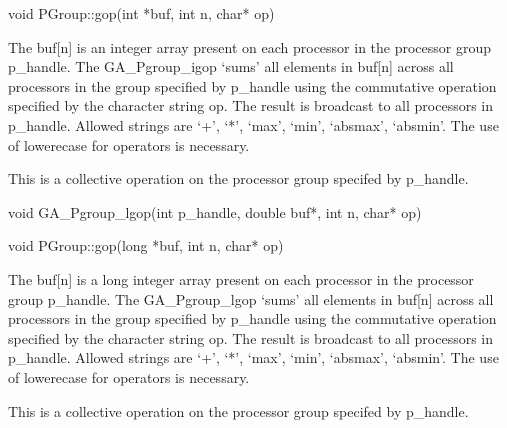 \documentclass[12pt]{article}
\begin{document}
\begin{cxxapi}
\begin{cxxcode}
void PGroup::gop(int *buf, int n, char* op)
\end{cxxcode}
\begin{funcargs}
\end{funcargs}
\end{cxxapi}
\gcoll
\begin{desc}

The buf[n] is an integer array present on each processor in the processor group p_handle. The GA_Pgroup_igop `sums' all elements in buf[n] across all processors in the group specified by p_handle using the commutative operation specified by the character string op.  The result is broadcast to all processors in p_handle. Allowed strings are `+', `*', `max', `min', `absmax', `absmin'. The use of lowerecase for operators is necessary.

This is a collective operation on the processor group specifed by p_handle.
\end{desc}


\begin{capi}
\begin{ccode}
void GA_Pgroup_lgop(int p_handle, double buf*, int n, char* op)
\end{ccode}
\begin{funcargs}
\end{funcargs}
\end{capi}

\begin{cxxapi}
\begin{cxxcode}
void PGroup::gop(long *buf, int n, char* op)
\end{cxxcode}
\begin{funcargs}
\end{funcargs}
\end{cxxapi}
\gcoll
\begin{desc}

The buf[n] is a long integer array present on each processor in the processor group p_handle. The GA_Pgroup_lgop `sums' all elements in buf[n] across all processors in the group specified by p_handle using the commutative operation specified by the character string op.  The result is broadcast to all processors in p_handle. Allowed strings are `+', `*', `max', `min', `absmax', `absmin'. The use of lowerecase for operators is necessary.

This is a collective operation on the processor group specifed by p_handle.
\end{desc}
\end{document}
